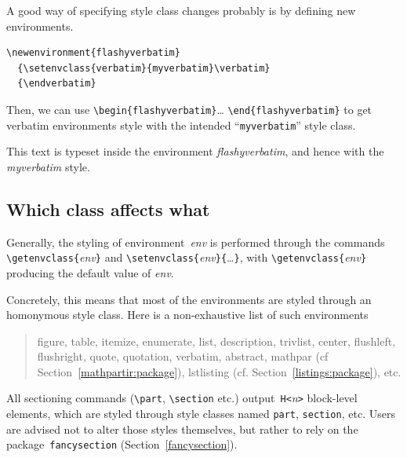 A good way of specifying style class changes probably is by defining
new environments.
\begin{verbatim}
\newenvironment{flashyverbatim}
  {\setenvclass{verbatim}{myverbatim}\verbatim}
  {\endverbatim}
\end{verbatim}
\newenvironment{flashyverbatim}
  {\setenvclass{verbatim}{myverbatim}\verbatim}
  {\endverbatim}%
Then, we can use \verb+\begin{flashyverbatim}+\ldots{}
\verb+\end{flashyverbatim}+ to get verbatim environments style with
the intended ``\texttt{myverbatim}'' style class.
\begin{htmlonly}\begin{flashyverbatim}
This text is typeset inside the environment
\emph{flashyverbatim}, and hence with the \emph{myverbatim}
style.
\end{flashyverbatim}
\end{htmlonly}

\subsection{Which class affects\label{whatclass} what}

Generally, the styling of environment~\textit{env} is performed through
the commands
\verb+\getenvclass{+\textit{env}\verb+}+
and \verb+\setenvclass{+\textit{env}\verb+}{+\ldots\verb+}+,
with \verb+\getenvclass{+\textit{env}\verb+}+ producing the
default value of \textit{env}.

Concretely, this means that most of the environments are styled through
an homonymous style class. Here is a non-exhaustive list of such
environments
\begin{quote}
figure, table, itemize, enumerate, list, description, 
trivlist, center, flushleft, flushright, quote,
quotation, verbatim, abstract, mathpar (cf
Section~\ref{mathpartir:package}), lstlisting
(cf. Section~\ref{listings:package}), etc.
\end{quote}

All sectioning commands (\verb+\part+, \verb+\section+ etc.)
output~\verb+H<+\textit{n}\verb+>+ block-level  elements, which are styled
through style classes named \texttt{part}, \texttt{section}, etc.
Users are advised not to alter those styles
themselves, but rather to rely on the package~\texttt{fancysection}
(Section~\ref{fancysection}).

